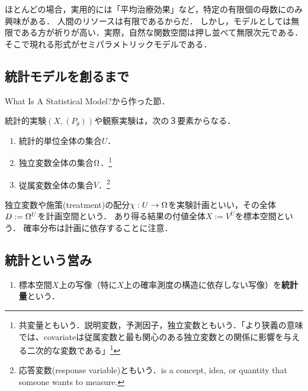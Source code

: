 \documentclass[uplatex,dvipdfmx]{jsreport}
\begin{document}
\begin{remarks}
    ほとんどの場合，実用的には「平均治療効果」など，特定の有限個の母数にのみ興味がある．
    人間のリソースは有限であるからだ．
    しかし，モデルとしては無限である方が祈りが高い．実際，自然な関数空間は押し並べて無限次元である．
    そこで現れる形式がセミパラメトリックモデルである．
\end{remarks}

\subsection{統計モデルを創るまで}

\begin{tcolorbox}[colframe=ForestGreen, colback=ForestGreen!10!white,breakable,colbacktitle=ForestGreen!40!white,coltitle=black,fonttitle=\bfseries\sffamily,
title=]
    What Is A Statistical Model?から作った節．
\end{tcolorbox}

\begin{definition}
    統計的実験$(X,(P_\theta))$や観察実験は，次の３要素からなる．
    \begin{enumerate}
        \item 統計的単位全体の集合$U$．
        \item 独立変数全体の集合$\Omega$．\footnote{共変量ともいう．説明変数，予測因子，独立変数ともいう．「より狭義の意味では、covariateは従属変数と最も関心のある独立変数との関係に影響を与える二次的な変数である」\footnote{https://en.wikipedia.org/wiki/Dependent\_and\_independent\_variables\#Statistics\_synonyms}}
        \item 従属変数全体の集合$V$．\footnote{応答変数(response variable)ともいう．is a concept, idea, or quantity that someone wants to measure.}
    \end{enumerate}
    独立変数や施策(treatment)の配分$\chi:U\to\Omega$を実験計画といい，その全体$D:=\Omega^U$を計画空間という．
    あり得る結果の付値全体$X:=V^U$を標本空間という．
    確率分布は計画に依存することに注意．
\end{definition}

\subsection{統計という営み}

\begin{definition}[statistic]\mbox{}
    \begin{enumerate}
        \item 標本空間$X$上の写像（特に$X$上の確率測度の構造に依存しない写像）を\textbf{統計量}という．
    \end{enumerate}
\end{definition}
\end{document}
